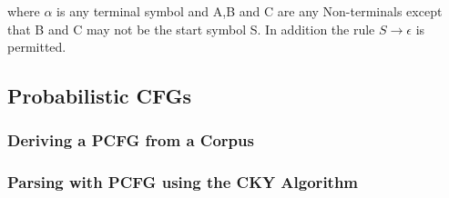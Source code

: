 where $\alpha$ is any terminal symbol and A,B and C are any Non-terminals except that B and C may not be the start symbol S.
In addition the rule $S \rightarrow \epsilon$ is permitted.
\cite[p.109]{sipser}

\subsection{Probabilistic CFGs}










\subsubsection{Deriving a PCFG from a Corpus}













\subsubsection{Parsing with PCFG using the CKY Algorithm}







